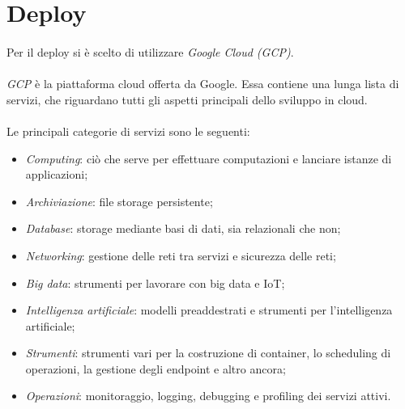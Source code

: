 \documentclass[11pt,a4paper,english]{article}
\begin{document}



\section{Deploy}

\paragraph{} Per il deploy si è scelto di utilizzare \emph{Google Cloud (GCP)}. 

\paragraph{} \emph{GCP} è la piattaforma cloud offerta da Google. Essa contiene una lunga lista di servizi, che riguardano tutti gli aspetti principali dello sviluppo in cloud.  

\paragraph{} Le principali categorie di servizi sono le seguenti:
\begin{itemize}
    \item \emph{Computing}: ciò che serve per effettuare computazioni e lanciare istanze di applicazioni;
    \item \emph{Archiviazione}: file storage persistente;
    \item \emph{Database}: storage mediante basi di dati, sia relazionali che non;
    \item \emph{Networking}: gestione delle reti tra servizi e sicurezza delle reti;
    \item \emph{Big data}: strumenti per lavorare con big data e IoT;
    \item \emph{Intelligenza artificiale}: modelli preaddestrati e strumenti per l'intelligenza artificiale;
    \item \emph{Strumenti}: strumenti vari per la costruzione di container, lo scheduling di operazioni, la gestione degli endpoint e altro ancora;
    \item \emph{Operazioni}: monitoraggio, logging, debugging e profiling dei servizi attivi.
\end{itemize}
\end{document}
